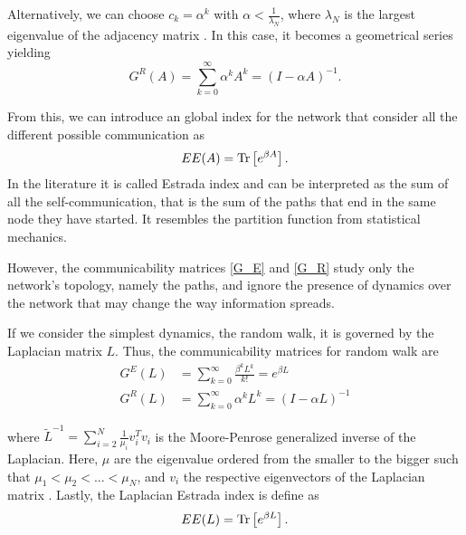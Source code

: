 Alternatively, we can choose $c_k = \alpha^{k}$ with $\alpha<\frac{1}{\lambda_N}$, where $\lambda_N$ is the largest eigenvalue of the adjacency matrix \cite{Katz}. In this case, it becomes a geometrical series yielding
\begin{equation}\label{G_R}
    G^R(A) =\sum_{k=0}^{\infty} \alpha^k A^k = (I -\alpha A)^{-1}.
\end{equation}


From this, we can introduce an global index for the network that consider all the different possible communication as
\begin{equation}
    EE(A)  = \operatorname{Tr}\left[e^{\beta A}\right].
\end{equation}
In the literature it is called Estrada index \cite{Estrada_2008} and can be interpreted as the sum of all the self-communication, that is the sum of the paths that end in the same node they have started. It resembles the partition function from statistical mechanics.


However, the communicability matrices \eqref{G_E} and \eqref{G_R} study only the network's topology, namely the paths, and ignore the presence of dynamics over the network that may change the way information spreads.

If we consider the simplest dynamics, the random walk, it is governed by the Laplacian matrix $L$. 
Thus, the communicability matrices for random walk are \cite{Estrada_2012}
\begin{equation}\label{Estrada indeces}
    \begin{split}
        G^E(L) &=\sum_{k=0}^{\infty} \frac{\beta^k L^k}{k!} = e^{\beta L}  \\ 
        G^R(L) &= \sum_{k=0}^{\infty} \alpha^k L^k = (I -\alpha L)^{-1}
    \end{split}
\end{equation}

where $\tilde{L}^{-1} = \sum_{i=2}^N \frac{1}{\mu_i}v_i^Tv_i$ is the Moore-Penrose generalized inverse of the Laplacian. Here, $\mu$ are the eigenvalue ordered from the smaller to the bigger such that $\mu_1 < \mu_2 < ... < \mu_N$, and $v_i$ the respective eigenvectors of the Laplacian matrix \cite{Generalized_inverse_Laplacian}.
Lastly, the Laplacian Estrada index is define as
\begin{equation}\label{EE_L}
    EE(L) = \operatorname{Tr}\left[e^{\beta L}\right].
\end{equation}

